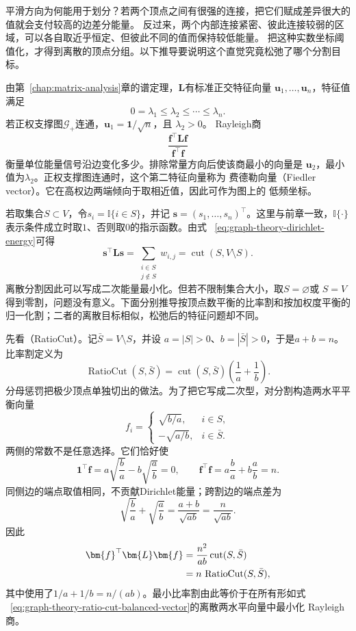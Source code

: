 平滑方向为何能用于划分？若两个顶点之间有很强的连接，把它们赋成差异很大的值就会支付较高的边差分能量。
反过来，两个内部连接紧密、彼此连接较弱的区域，可以各自取近乎恒定、但彼此不同的值而保持较低能量。
把这种实数坐标阈值化，才得到离散的顶点分组。以下推导要说明这个直觉究竟松弛了哪个分割目标。

由第~\ref{chap:matrix-analysis}章的谱定理，\(\bm{L}\)有标准正交特征向量
\(\bm{u}_1,\ldots,\bm{u}_n\)，特征值满足
\[
  0=\lambda_1\leq\lambda_2\leq\cdots\leq\lambda_n.
\]
若正权支撑图\(\mathcal{G}_+\)连通，\(\bm{u}_1=\bm{1}/\sqrt{n}\)，且
\(\lambda_2>0\)。
Rayleigh商
\[
  \frac{\bm{f}^{\top}\bm{L}\bm{f}}
       {\bm{f}^{\top}\bm{f}}
\]
衡量单位能量信号沿边变化多少。排除常量方向后使该商最小的向量是
\(\bm{u}_2\)，最小值为\(\lambda_2\)。正权支撑图连通时，这个第二特征向量称为
费德勒向量（Fiedler vector）。它在高权边两端倾向于取相近值，因此可作为图上的
低频坐标。

若取集合\(S\subset V\)，令\(s_i=\mathbb{I}\{i\in S\}\)，并记
\(\bm{s}=(s_1,\ldots,s_n)^{\top}\)。这里与前章一致，\(\mathbb{I}\{\cdot\}\)
表示条件成立时取\(1\)、否则取\(0\)的指示函数。由式
~\eqref{eq:graph-theory-dirichlet-energy}可得
\begin{equation}
  \bm{s}^{\top}\bm{L}\bm{s}
  =\sum_{\substack{i\in S\\j\notin S}}w_{i,j}
  =
  \operatorname{cut}(S,V\setminus S).
  \label{eq:graph-theory-indicator-cut-energy}
\end{equation}
离散分割因此可以写成二次能量最小化。但若不限制集合大小，取\(S=\varnothing\)或
\(S=V\)得到零割，问题没有意义。下面分别推导按顶点数平衡的比率割和按加权度平衡的
归一化割；二者的离散目标相似，松弛后的特征问题却不同。

先看（RatioCut）。记\(\bar S=V\setminus S\)，并设
\(a=|S|>0\)、\(b=|\bar S|>0\)，于是\(a+b=n\)。比率割定义为
\begin{equation}
  \operatorname{RatioCut}(S,\bar S)
  =
  \operatorname{cut}(S,\bar S)
  \left(\frac1a+\frac1b\right).
  \label{eq:graph-theory-ratio-cut}
\end{equation}
分母惩罚把极少顶点单独切出的做法。为了把它写成二次型，对分割构造两水平平衡向量
\begin{equation}
  f_i=
  \begin{cases}
    \sqrt{b/a},&i\in S,\\
    -\sqrt{a/b},&i\in\bar S.
  \end{cases}
  \label{eq:graph-theory-ratio-cut-balanced-vector}
\end{equation}
两侧的常数不是任意选择。它们恰好使
\[
  \bm{1}^{\top}\bm{f}
  =a\sqrt{\frac ba}-b\sqrt{\frac ab}=0,
  \qquad
  \bm{f}^{\top}\bm{f}
  =a\frac ba+b\frac ab=n.
\]
同侧边的端点取值相同，不贡献Dirichlet能量；跨割边的端点差为
\[
  \sqrt{\frac ba}+\sqrt{\frac ab}
  =\frac{a+b}{\sqrt{ab}}=\frac{n}{\sqrt{ab}}.
\]
因此
\begin{align}
  \bm{f}^{\top}\bm{L}\bm{f}
  &=
  \frac{n^2}{ab}\operatorname{cut}(S,\bar S)\notag\\
  &=
  n\,\operatorname{RatioCut}(S,\bar S),
  \label{eq:graph-theory-ratio-cut-energy}
\end{align}
其中使用了\(1/a+1/b=n/(ab)\)。最小比率割由此等价于在所有形如式
~\eqref{eq:graph-theory-ratio-cut-balanced-vector}的离散两水平向量中最小化
Rayleigh商。

